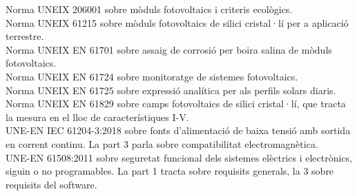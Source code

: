 \newline Norma UNEIX 206001 sobre mòduls fotovoltaics i criteris ecològics.\\
\newline Norma UNEIX 61215 sobre mòduls fotovoltaics de silici cristal·lí per a aplicació terrestre.\\
\newline Norma UNEIX EN 61701 sobre assaig de corrosió per boira salina de mòduls fotovoltaics.\\
\newline Norma UNEIX EN 61724 sobre monitoratge de sistemes fotovoltaics. \\
\newline Norma UNEIX EN 61725 sobre expressió analítica per als perfils solars diaris.\\
\newline Norma UNEIX EN 61829 sobre camps fotovoltaics de silici cristal·lí, que tracta la mesura en el lloc de característiques I-V.\\
\newline UNE-EN IEC 61204-3:2018 sobre fonts d'alimentació de baixa tensió amb sortida en corrent continu. La part 3 parla sobre compatibilitat electromagnètica.\\
\newline UNE-EN 61508:2011 sobre seguretat funcional dels sistemes elèctrics i electrònics, siguin o no programables. La part 1 tracta sobre requisits generals, la 3 sobre requisits del software.
